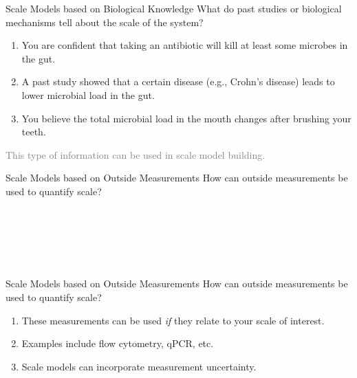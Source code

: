 \documentclass[
  ignorenonframetext,
]{beamer}
\begin{document}
\begin{frame}{Scale Models based on Biological Knowledge}
\protect\hypertarget{scale-models-based-on-biological-knowledge-1}{}
What do past studies or biological mechanisms tell about the scale of
the system?

\vspace{.1in}

\begin{enumerate}
\item
  You are confident that taking an antibiotic will kill at least some
  microbes in the gut.
\item
  A past study showed that a certain disease (e.g., Crohn's disease)
  leads to lower microbial load in the gut.
\item
  You believe the total microbial load in the mouth changes after
  brushing your teeth.
\end{enumerate}

\textcolor{gray}{This type of information can be used in scale model building.}
\end{frame}

\begin{frame}{Scale Models based on Outside Measurements}
\protect\hypertarget{scale-models-based-on-outside-measurements}{}
How can outside measurements be used to quantify scale?

\vspace{.1in}

\textcolor{white}{1. These measurements can be used *if* they relate to your scale of interest.}

\textcolor{white}{2. Examples include flow cytometry, qPCR, etc.}

\textcolor{white}{3. Scale models can incorporate measurement uncertainty.}
\end{frame}

\begin{frame}{Scale Models based on Outside Measurements}
\protect\hypertarget{scale-models-based-on-outside-measurements-1}{}
How can outside measurements be used to quantify scale?

\vspace{.1in}

\begin{enumerate}
\item
  These measurements can be used \emph{if} they relate to your scale of
  interest.
\item
  Examples include flow cytometry, qPCR, etc.
\item
  Scale models can incorporate measurement uncertainty.
\end{enumerate}
\end{frame}
\end{document}
